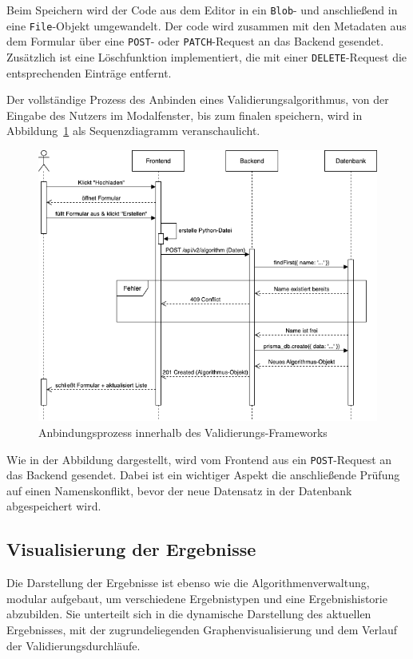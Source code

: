Beim Speichern wird der Code aus dem Editor in ein \texttt{Blob}- und anschließend in eine \texttt{File}-Objekt umgewandelt. Der code wird zusammen mit den Metadaten aus dem Formular über eine \texttt{POST}- oder \texttt{PATCH}-Request an das Backend gesendet. Zusätzlich ist eine Löschfunktion implementiert, die mit einer \texttt{DELETE}-Request die entsprechenden Einträge entfernt.

Der vollständige Prozess des Anbinden eines Validierungsalgorithmus, von der Eingabe des Nutzers im Modalfenster, bis zum finalen speichern, wird in Abbildung~\ref{fig:anbindung} als Sequenzdiagramm veranschaulicht.

\begin{figure}[h!]
  \centering
  \includegraphics[width=\textwidth]{figures/05Implementierung/Sequenz_Algo_erstellen.drawio.png}
  \caption{Anbindungsprozess innerhalb des Validierungs-Frameworks}
  \label{fig:anbindung}
\end{figure}

Wie in der Abbildung dargestellt, wird vom Frontend aus ein \texttt{POST}-Request an das Backend gesendet. Dabei ist ein wichtiger Aspekt die anschließende Prüfung auf einen Namenskonflikt, bevor der neue Datensatz in der Datenbank abgespeichert wird.

\subsection{Visualisierung der Ergebnisse}
\label{subsec:visual}
Die Darstellung der Ergebnisse ist ebenso wie die Algorithmenverwaltung, modular aufgebaut, um verschiedene Ergebnistypen und eine Ergebnishistorie abzubilden. Sie unterteilt sich in die dynamische Darstellung des aktuellen Ergebnisses, mit der zugrundeliegenden Graphenvisualisierung und dem Verlauf der Validierungsdurchläufe.

